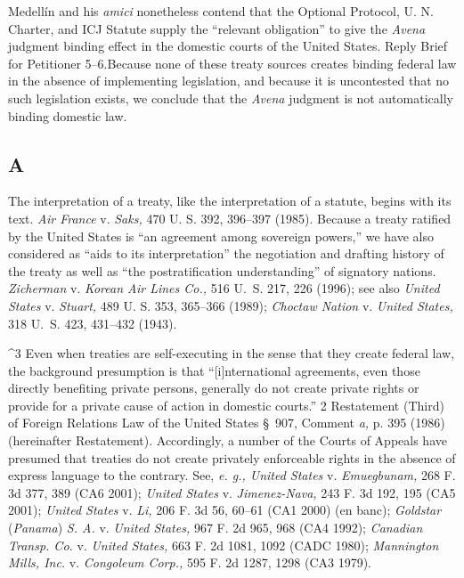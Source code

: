 {{{  Medellín and his \emph{amici} nonetheless contend that the Optional
Protocol, U. N. Charter, and ICJ Statute supply the ``relevant
obligation'' to give the \emph{Avena} judgment binding effect in the
domestic courts of the United States. Reply Brief for Petitioner
5--6.\footnotemark[4] Because none of these treaty sources creates binding
federal law in the absence of implementing legislation, and because it
is uncontested that no such legislation exists, we conclude that the
\emph{Avena} judgment is not automatically binding domestic law.

\subsection{A}

  The interpretation of a treaty, like the interpretation of a statute,
begins with its text. \emph{Air France} v. \emph{Saks,} 470 \newpage  U. S.
392, 396--397 (1985). Because a treaty ratified by the United States
is ``an agreement among sovereign powers,'' we have also considered as
``aids to its interpretation'' the negotiation and drafting history
of the treaty as well as ``the postratification understanding'' of
signatory nations. \emph{Zicherman} v. \emph{Korean Air Lines Co.,} 516
U.~S. 217, 226 (1996); see also \emph{United States} v. \emph{Stuart,} 489 U.
S. 353, 365--366 (1989); \emph{Choctaw Nation} v. \emph{United States,} 318
U.~S. 423, 431--432 (1943).

^3 Even when treaties are self-executing in the sense that they create
federal law, the background presumption is that ``[i]nternational
agreements, even those directly benefiting private persons, generally
do not create private rights or provide for a private cause of action
in domestic courts.'' 2 Restatement (Third) of Foreign Relations Law
of the United States \S~907, Comment \emph{a,} p. 395 (1986) (hereinafter
Restatement). Accordingly, a number of the Courts of Appeals have
presumed that treaties do not create privately enforceable rights
in the absence of express language to the contrary. See, \emph{e. g.,
United States} v. \emph{Emuegbunam,} 268 F. 3d 377, 389 (CA6 2001);
\emph{United States} v. \emph{Jimenez-Nava,} 243 F. 3d 192, 195 (CA5 2001);
\emph{United States} v. \emph{Li,} 206 F. 3d 56, 60--61 (CA1 2000) (en banc);
\emph{Goldstar} (\emph{Panama}) \emph{S. A.} v. \emph{United States,} 967 F. 2d 965,
968 (CA4 1992); \emph{Canadian Transp. Co.} v. \emph{United States,} 663 F.
2d 1081, 1092 (CADC 1980); \emph{Mannington Mills, Inc.} v. \emph{Congoleum
Corp.,} 595 F. 2d 1287, 1298 (CA3 1979).

}}}
